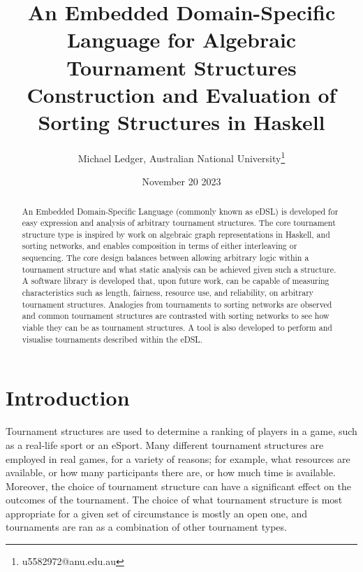 \documentclass[a4,11pt,twoside,final,hidelinks]{article}
\author{Michael Ledger, Australian National University\thanks{u5582972@anu.edu.au}}
\date{November 20 2023}
\title{An Embedded Domain-Specific Language for Algebraic Tournament Structures\\\medskip
\large Construction and Evaluation of Sorting Structures in Haskell}
\begin{document}
\maketitle
\begin{abstract}
An Embedded Domain-Specific Language (commonly known as eDSL) is developed for
easy expression and analysis of arbitrary tournament structures. The core
tournament structure type is inspired by work on algebraic graph representations
in Haskell, and sorting networks, and enables composition in terms of either
interleaving or sequencing. The core design balances between allowing arbitrary
logic within a tournament structure and what static analysis can be achieved
given such a structure. A software library is developed that, upon future work,
can be capable of measuring characteristics such as length, fairness, resource
use, and reliability, on arbitrary tournament structures. Analogies from
tournaments to sorting networks are observed and common tournament structures
are contrasted with sorting networks to see how viable they can be as tournament
structures. A tool is also developed to perform and visualise tournaments
described within the eDSL.
\end{abstract}
\newpage

\setcounter{tocdepth}{2}
\tableofcontents
\newpage
{}



\section{Introduction}
\label{sec:orga60ad6c}

Tournament structures are used to determine a ranking of players in a game, such
as a real-life sport or an eSport. Many different tournament structures are
employed in real games, for a variety of reasons; for example, what resources
are available, or how many participants there are, or how much time is
available. Moreover, the choice of tournament structure can have a significant
effect on the outcomes of the tournament. The choice of what tournament
structure is most appropriate for a given set of circumstance is mostly an open
one, and tournaments are ran as a combination of other tournament types.
\end{document}
